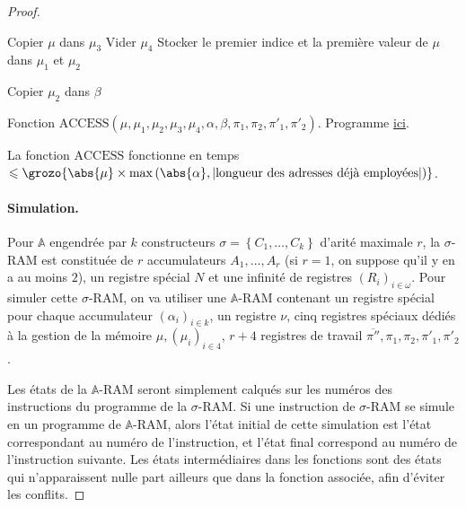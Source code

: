 \documentclass{report}
\newcommand{\bbA}{\mathbb{A}}
\begin{document}
\begin{proof}
\begin{algorithm}[H]
						
						Copier $\mu$ dans $\mu_3$ \;
						Vider $\mu_4$ \;
						Stocker le premier indice et la première valeur de $\mu$ dans $\mu_1$ et $\mu_2$ \;
						
						\espace
						
						
						
						
						Copier $\mu_2$ dans $\beta$ \;
						
						\caption{Fonction $\text{ACCESS}\left( \mu, \mu_1, \mu_2, \mu_3, \mu_4, \alpha, \beta, \pi_1, \pi_2, \pi'_1, \pi'_2\right)$. Programme \hyperref[prog:A_RAM_fn_ACCESS]{ici}. }
					\end{algorithm}
					
					\espace

					La fonction $\text{ACCESS}$ fonctionne en temps $\leqslant \grozo{\abs{\mu} \times \max\left( \abs{\alpha} , \left| \text{longueur des adresses déjà employées} \right| \right) }$.
					
					\paragraph{Simulation.}
					\label{par:sim_sigma_RAM_A_RAM}
					Pour $\bbA$ engendrée par $k$ constructeurs $\sigma = \left\lbrace C_1, \dots, C_k\right\rbrace$ d'arité maximale $r$, la $\sigma$-RAM est constituée de $r$ accumulateurs $A_1, \dots, A_r$ (si $r = 1$, on suppose qu'il y en a au moins $2$), un registre spécial $N$ et une infinité de registres $(R_i)_{i \in \omega}$. Pour simuler cette $\sigma$-RAM, on va utiliser une $\bbA$-RAM contenant un registre spécial pour chaque accumulateur $(\alpha_i)_{i \in k}$, un registre $\nu$, cinq registres spéciaux dédiés à la gestion de la mémoire $\mu, (\mu_i)_{i \in 4}$, $r+4$ registres de travail $\overline{\pi''}, \pi_1, \pi_2, \pi'_1, \pi'_2$.
					
					Les états de la $\bbA$-RAM seront simplement calqués sur les numéros des instructions du programme de la $\sigma$-RAM. Si une instruction de $\sigma$-RAM se simule en un programme de $\bbA$-RAM, alors l'état initial de cette simulation est l'état correspondant au numéro de l'instruction, et l'état final correspond au numéro de l'instruction suivante. Les états intermédiaires dans les fonctions sont des états qui n'apparaissent nulle part ailleurs que dans la fonction associée, afin d'éviter les conflits. 
						

\end{proof}
\end{document}
